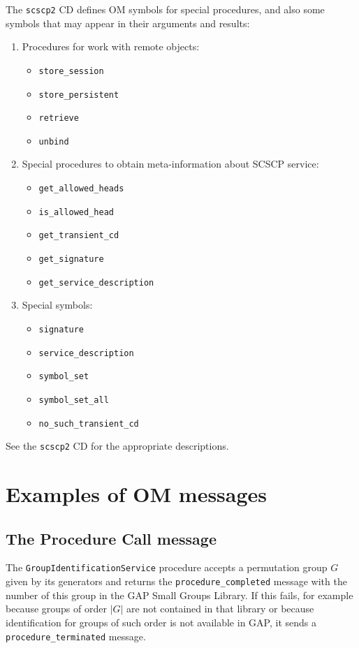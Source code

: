 \documentclass{amsart}
\begin{document}
The {\tt scscp2} CD \cite{scscp2} defines OM symbols for special procedures, and also
some symbols that may appear in their arguments and results:

\begin{enumerate}
\item Procedures for work with remote objects:
\begin{itemize}
\item \verb|store_session|
\item \verb|store_persistent|
\item \verb|retrieve|
\item \verb|unbind|
\end{itemize}
\item Special procedures to obtain meta-information about SCSCP service:
\begin{itemize}
\item \verb|get_allowed_heads|
\item \verb|is_allowed_head|
\item \verb|get_transient_cd|
\item \verb|get_signature|
\item \verb|get_service_description|
\end{itemize}
\item Special symbols:
\begin{itemize}
\item \verb|signature|
\item \verb|service_description|
\item \verb|symbol_set|
\item \verb|symbol_set_all|
\item \verb|no_such_transient_cd|
\end{itemize}
\end{enumerate}

\noindent See the {\tt scscp2} CD \cite{scscp2} for the appropriate descriptions.

\newpage

\section{Examples of OM messages}

\subsection{The Procedure Call message}

The \verb|GroupIdentificationService| procedure accepts a permutation group $G$
given by its generators and returns the \verb|procedure_completed|
message with the number of this group in the GAP Small Groups Library.
If this fails, for example because groups of order $|G|$ are
not contained in that library or because identification for groups of such order
is not available in GAP, it sends a \verb|procedure_terminated| message.
\end{document}
